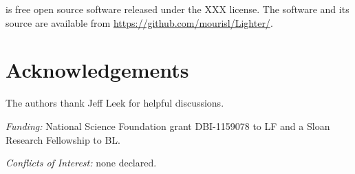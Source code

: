 \documentclass[10pt]{article}
\begin{document}
\tool is free open source software released under the XXX license.  The software and its source are available from \url{https://github.com/mourisl/Lighter/}.

\section*{Acknowledgements}
The authors thank Jeff Leek for helpful discussions.

\noindent\emph{Funding:} National Science Foundation grant DBI-1159078 to LF and a Sloan Research Fellowship to BL.

\noindent\emph{Conflicts of Interest:} none declared.



\end{document}
